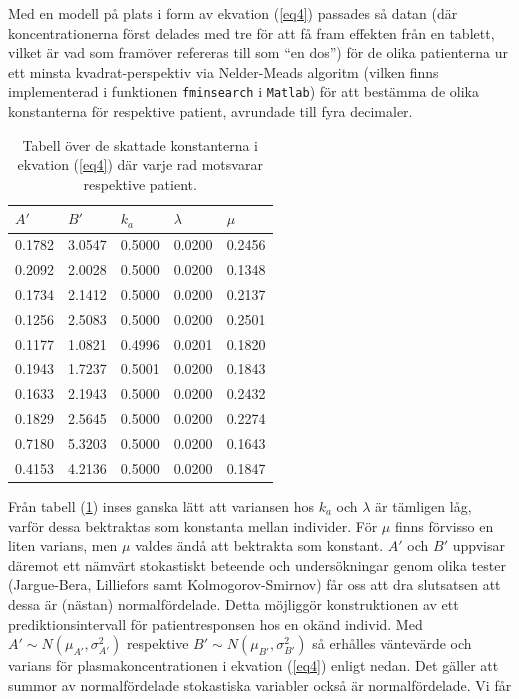 \documentclass[a4paper,11pt]{article}
\begin{document}
Med en modell på plats i form av ekvation (\ref{eq4}) passades så datan (där koncentrationerna först delades med tre för att få fram effekten från en tablett, vilket är vad som framöver refereras till som ``en dos'') för de olika patienterna ur ett minsta kvadrat-perspektiv via Nelder-Meads algoritm (vilken finns implementerad i funktionen \texttt{fminsearch} i \texttt{Matlab}) för att bestämma de olika konstanterna för respektive patient, avrundade till fyra decimaler.
\begin{table}[H]
\centering
\caption{Tabell över de skattade konstanterna i ekvation (\ref{eq4}) där varje rad motsvarar respektive patient.}
\label{tab1}
\begin{tabular}{lllll}
$A'$   & $B'$   & $k_a$  & $\lambda$ & $\mu$  \\ \hline
0.1782 & 3.0547 & 0.5000 & 0.0200    & 0.2456 \\
0.2092 & 2.0028 & 0.5000 & 0.0200    & 0.1348 \\
0.1734 & 2.1412 & 0.5000 & 0.0200    & 0.2137 \\
0.1256 & 2.5083 & 0.5000 & 0.0200    & 0.2501 \\
0.1177 & 1.0821 & 0.4996 & 0.0201    & 0.1820 \\
0.1943 & 1.7237 & 0.5001 & 0.0200    & 0.1843 \\
0.1633 & 2.1943 & 0.5000 & 0.0200    & 0.2432 \\
0.1829 & 2.5645 & 0.5000 & 0.0200    & 0.2274 \\
0.7180 & 5.3203 & 0.5000 & 0.0200    & 0.1643 \\
0.4153 & 4.2136 & 0.5000 & 0.0200    & 0.1847
\end{tabular}
\end{table}
Från tabell (\ref{tab1}) inses ganska lätt att variansen hos $k_a$ och $\lambda$ är tämligen låg, varför dessa bektraktas som konstanta mellan individer. För $\mu$ finns förvisso en liten varians, men $\mu$ valdes ändå att bektrakta som konstant. $A'$ och $B'$ uppvisar däremot ett nämvärt stokastiskt beteende och undersökningar genom olika tester (Jargue-Bera, Lilliefors samt Kolmogorov-Smirnov) får oss att dra slutsatsen att dessa är (nästan) normalfördelade. Detta möjliggör konstruktionen av ett prediktionsintervall för patientresponsen hos en okänd individ. Med $A' \sim N(\mu_{A'}, \sigma_{A'}^2)$ respektive $B' \sim N(\mu_{B'}, \sigma_{B'}^2)$ så erhålles väntevärde och varians för plasmakoncentrationen i ekvation (\ref{eq4}) enligt nedan. Det gäller att summor av normalfördelade stokastiska variabler också är normalfördelade. Vi får
\end{document}
